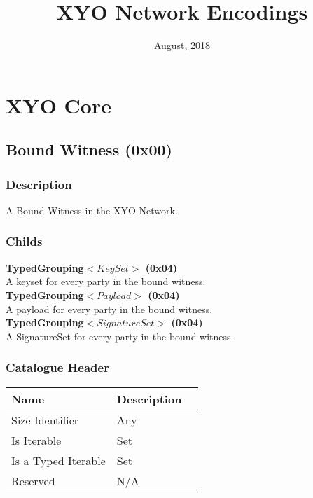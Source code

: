\documentclass[11pt]{article}
\title{XYO Network Encodings}
\date{August, 2018}
\begin{document}
\maketitle



\section{XYO Core}


\subsection{Bound Witness (0x00)}
\subsubsection{Description}
A Bound Witness in the XYO Network.

\subsubsection{Childs}
\textbf{TypedGrouping$<KeySet>$ (0x04)} \\
A keyset for every party in the bound witness. \\
\textbf{TypedGrouping$<Payload>$ (0x04)} \\
A payload for every party in the bound witness. \\
\textbf{TypedGrouping$<SignatureSet>$ (0x04)} \\
A SignatureSet for every party in the bound witness. 

\subsubsection{Catalogue Header}

\begin{center}
\begin{tabular}{ |l|l|l| } 
\hline
\textbf{Name} & \textbf{Description}\\
\hline
Size Identifier & Any \\
Is Iterable & Set \\
Is a Typed Iterable & Set \\   
Reserved & N/A \\ 
\hline
\end{tabular}
\end{center}
\end{document}
